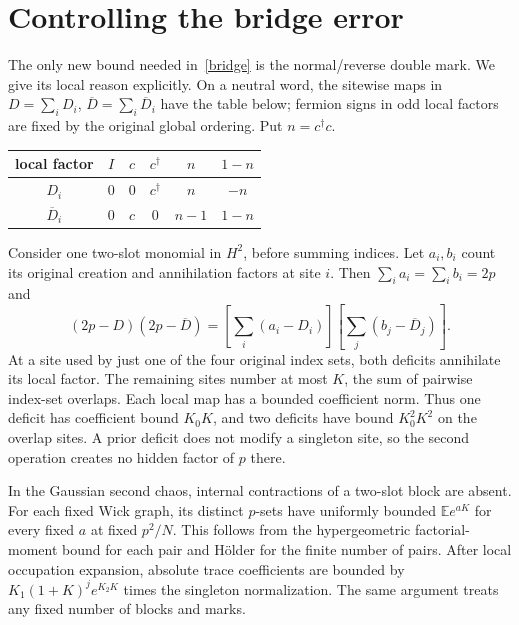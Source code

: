\documentclass[11pt,a4paper]{article}
\newcommand{\EE}{\mathbb E}
\newcommand{\Db}{\overline D}
\begin{document}
\newpage
\section{Controlling the bridge error}
The only new bound needed in~\eqref{bridge} is the normal/reverse
double mark. We give its local reason explicitly. On a neutral word,
the sitewise maps in $D=\sum_iD_i$, $\Db=\sum_i\Db_i$ have the table
below; fermion signs in odd local factors are fixed by the original
global ordering. Put $n=c^\dagger c$.
\begin{center}
\begin{tabular}{c|ccccc}
local factor&$I$&$c$&$c^\dagger$&$n$&$1-n$\\\hline
$D_i$&$0$&$0$&$c^\dagger$&$n$&$-n$\\
$\Db_i$&$0$&$c$&$0$&$n-1$&$1-n$
\end{tabular}
\end{center}
Consider one two-slot monomial in $H^2$, before summing indices.
Let $a_i,b_i$ count its original creation and annihilation factors
at site $i$. Then $\sum_i a_i=\sum_i b_i=2p$ and
\begin{equation}
 (2p-D)(2p-\Db)=
 \left[\sum_i(a_i-D_i)\right]\left[\sum_j(b_j-\Db_j)\right].
\end{equation}
At a site used by just one of the four original index sets, both
deficits annihilate its local factor. The remaining sites number
at most $K$, the sum of pairwise index-set overlaps. Each local
map has a bounded coefficient norm. Thus one deficit has coefficient
bound $K_0K$, and two deficits have bound $K_0^2K^2$ on the overlap
sites. A prior deficit does not modify a singleton site, so the
second operation creates no hidden factor of $p$ there.

In the Gaussian second chaos, internal contractions of a two-slot
block are absent. For each fixed Wick graph, its distinct $p$-sets
have uniformly bounded $\EE e^{aK}$ for every fixed $a$ at fixed
$p^2/N$. This follows from the hypergeometric factorial-moment bound
for each pair and H\"older for the finite number of pairs. After local
occupation expansion, absolute trace coefficients are bounded by
$K_1(1+K)^j e^{K_2K}$ times the singleton normalization.
The same argument treats any fixed number of blocks and marks.
\end{document}
